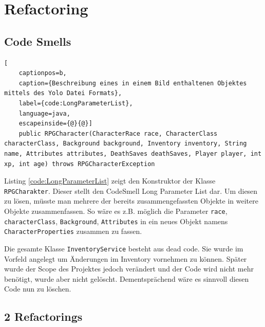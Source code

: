 \chapter{Refactoring}

\section{Code Smells}
\begin{lstlisting}[
	captionpos=b,
	caption={Beschreibung eines in einem Bild enthaltenen Objektes mittels des Yolo Datei Formats},
	label={code:LongParameterList},
	language=java,
	escapeinside={@}{@}]
	public RPGCharacter(CharacterRace race, CharacterClass characterClass, Background background, Inventory inventory, String name, Attributes attributes, DeathSaves deathSaves, Player player, int xp, int age) throws RPGCharacterException
\end{lstlisting}
Listing \ref{code:LongParameterList} zeigt den Konstruktor der Klasse \texttt{RPGCharakter}. Dieser stellt den CodeSmell Long Parameter List dar. Um diesen zu lösen, müsste man mehrere der bereits zusammengefassten Objekte in weitere Objekte zusammenfassen. So wäre es z.B. möglich die Parameter \texttt{race}, \texttt{characterClass}, \texttt{Background}, \texttt{Attributes} in ein neues Objekt namens \texttt{CharacterProperties} zusammen zu fassen.

Die gesamte Klasse \texttt{InventoryService} besteht aus dead code. Sie wurde im Vorfeld angelegt um Änderungen im Inventory vornehmen zu können. Später wurde der Scope des Projektes jedoch verändert und der Code wird nicht mehr benötigt, wurde aber nicht gelöscht. Dementsprächend wäre es sinnvoll diesen Code nun zu löschen.

\section{2 Refactorings}
